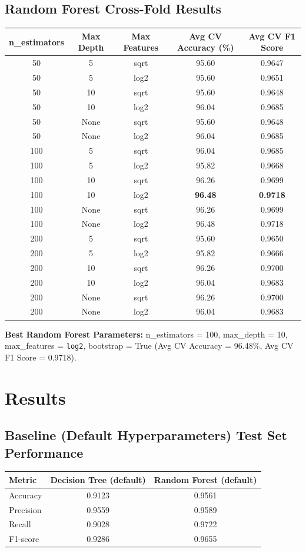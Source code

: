 \documentclass[12pt,a4paper]{article}
\begin{document}
\subsection*{Random Forest Cross-Fold Results}
\begin{longtable}{ccccc}
\toprule
n\_estimators & Max Depth & Max Features & Avg CV Accuracy (\%) & Avg CV F1 Score \\
\midrule
\endhead
50 & 5 & sqrt & 95.60 & 0.9647 \\
50 & 5 & log2 & 95.60 & 0.9651 \\
50 & 10 & sqrt & 95.60 & 0.9648 \\
50 & 10 & log2 & 96.04 & 0.9685 \\
50 & None & sqrt & 95.60 & 0.9648 \\
50 & None & log2 & 96.04 & 0.9685 \\
100 & 5 & sqrt & 96.04 & 0.9685 \\
100 & 5 & log2 & 95.82 & 0.9668 \\
100 & 10 & sqrt & 96.26 & 0.9699 \\
100 & 10 & log2 & \textbf{96.48} & \textbf{0.9718} \\
100 & None & sqrt & 96.26 & 0.9699 \\
100 & None & log2 & 96.48 & 0.9718 \\
200 & 5 & sqrt & 95.60 & 0.9650 \\
200 & 5 & log2 & 95.82 & 0.9666 \\
200 & 10 & sqrt & 96.26 & 0.9700 \\
200 & 10 & log2 & 96.04 & 0.9683 \\
200 & None & sqrt & 96.26 & 0.9700 \\
200 & None & log2 & 96.04 & 0.9683 \\
\bottomrule
\end{longtable}
\textbf{Best Random Forest Parameters:} n\_estimators = 100, max\_depth = 10,
max\_features = \texttt{log2}, bootstrap = True (Avg CV Accuracy = 96.48\%,
Avg CV F1 Score = 0.9718).

\section{Results}

\subsection*{Baseline (Default Hyperparameters) Test Set Performance}
\begin{tabular}{lcc}
\toprule
Metric & Decision Tree (default) & Random Forest (default) \\
\midrule
Accuracy & 0.9123 & 0.9561 \\
Precision & 0.9559 & 0.9589 \\
Recall & 0.9028 & 0.9722 \\
F1-score & 0.9286 & 0.9655 \\
\bottomrule
\end{tabular}
\end{document}
